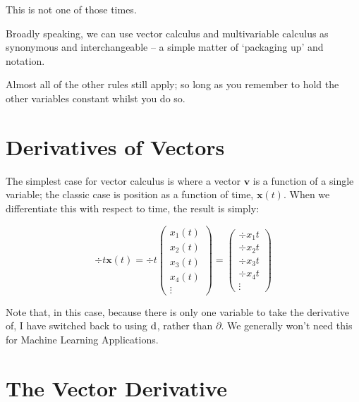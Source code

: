 \documentclass[a4paper,openany,11pt]{book}
\renewcommand\vec[1]{\boldsymbol{\mathbf{#1}}}
\begin{document}
				This is not one of those times. 
	
				Broadly speaking, we can use vector calculus and multivariable calculus as synonymous and interchangeable -- a simple matter of `packaging up' and notation.


			Almost all of the other rules still apply; so long as you remember to hold the other variables constant whilst you do so. 

		\section{Derivatives of Vectors}

			The simplest case for vector calculus is where a vector $\vec{v}$ is a function of a single variable; the classic case is position as a function of time, $\vec{x}(t)$. When we differentiate this with respect to time, the result is simply:

			\begin{equation}
				\div{}{t} \vec{x}(t) = \div{}{t} \begin{pmatrix} x_1(t) \\ x_2(t) \\ x_3(t) \\ x_4(t) \\\vdots \end{pmatrix} = \begin{pmatrix} \div{x_1}{t} \\ \div{x_2}{t} \\ \div{x_3}{t} \\ \div{x_4}{t} \\ \vdots \end{pmatrix}
			\end{equation}

			Note that, in this case, because there is only one variable to take the derivative of, I have switched back to using $\mathrm d$, rather than $\partial$. We generally won't need this for Machine Learning Applications.

		\section{The Vector Derivative}
\end{document}
